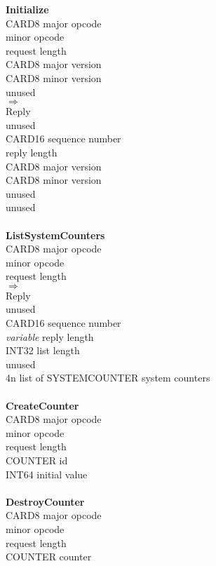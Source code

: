 \renewcommand{\thefootnote}{\fnsymbol{footnote}}
\setcounter{footnote}{1}
\setlength{\topsep}{0pt}	%
\begin{tabbing}
\tabstopsC
{\bf Initialize}\\
		\> CARD8	\> major opcode \\
				\> minor opcode \\
	\> 2			\> request length \\
		\> CARD8	\> major version \\
		\> CARD8	\> minor version \\
		\> 		\> unused \\
$\Rightarrow$\\
	\> 1			\> Reply \\
		\>		\> unused \\
		\> CARD16	\> sequence number \\
				\> reply length \\
		\> CARD8	\> major version \\
		\> CARD8	\> minor version \\
		\>		\> unused \\
		\>		\> unused \\
\\
{\bf ListSystemCounters}\\
		\> CARD8	\> major opcode \\
	\> 1			\> minor opcode \\
				\> request length \\
$\Rightarrow$\\
	\> 1			\> Reply \\
		\>		\> unused \\
		\> CARD16	\> sequence number \\
		\> {\it variable} \> reply length \\
		\> INT32	\> list length \\
		\>		\> unused \\
	\> 4n   \> list of SYSTEMCOUNTER \> system counters \\
\\
{\bf CreateCounter}\\
		\> CARD8	\> major opcode \\
				\> minor opcode \\
				\> request length \\
		\> COUNTER	\> id\\
		\> INT64	\> initial value\\
\\
{\bf DestroyCounter}\\
		\> CARD8	\> major opcode \\
				\> minor opcode\footnotemark[1] \\
	\> 2			\> request length \\
		\> COUNTER	\> counter
\end{tabbing}
